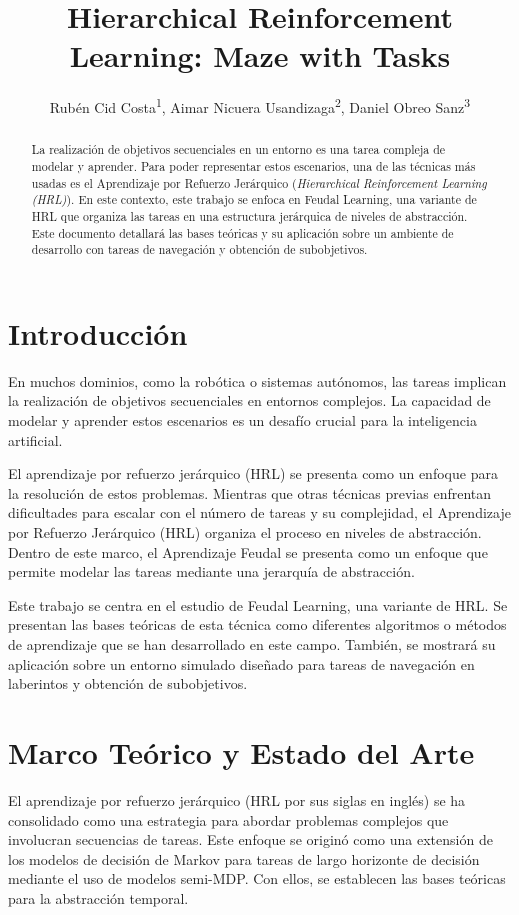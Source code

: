 \documentclass[letterpaper]{article} %
\title{Hierarchical Reinforcement Learning: Maze with Tasks}
\author {
    Rubén Cid Costa\textsuperscript{\rm 1},
    Aimar Nicuera Usandizaga\textsuperscript{\rm 2},
    Daniel Obreo Sanz\textsuperscript{\rm 3}
}
\begin{document}
\maketitle

\begin{abstract}
La realización de objetivos secuenciales en un entorno es una tarea compleja de modelar y aprender. Para poder representar estos
escenarios, una de las técnicas más usadas es el Aprendizaje por Refuerzo Jerárquico (\textit{Hierarchical Reinforcement Learning (HRL)}).
En este contexto, este trabajo se enfoca en Feudal Learning, una variante de HRL que organiza las tareas en una estructura jerárquica de
niveles de abstracción. Este documento detallará las bases teóricas y su aplicación sobre un ambiente de desarrollo con tareas de navegación y
obtención de subobjetivos.
\end{abstract}

\section{Introducción}

En muchos dominios, como la robótica o sistemas autónomos, las tareas implican la realización de objetivos secuenciales en entornos complejos.
La capacidad de modelar y aprender estos escenarios es un desafío crucial para la inteligencia artificial.


El aprendizaje por refuerzo jerárquico (HRL) se presenta como un enfoque para la resolución de estos problemas. Mientras que otras técnicas previas
enfrentan dificultades para escalar con el número de tareas y su complejidad, el Aprendizaje por Refuerzo Jerárquico (HRL) organiza el proceso en 
niveles de abstracción. Dentro de este marco, el Aprendizaje Feudal se presenta como un enfoque que permite modelar las tareas mediante una jerarquía
de abstracción.


Este trabajo se centra en el estudio de Feudal Learning, una variante de HRL. Se presentan las bases teóricas de esta técnica como diferentes algoritmos
o métodos de aprendizaje que se han desarrollado en este campo. También, se mostrará su aplicación sobre un entorno simulado diseñado para tareas 
de navegación en laberintos y obtención de subobjetivos. 

\section{Marco Teórico y Estado del Arte}
El aprendizaje por refuerzo jerárquico (HRL por sus siglas en inglés) se ha consolidado como una estrategia para abordar problemas complejos
que involucran secuencias de tareas. Este enfoque se originó como una extensión de los modelos de decisión de Markov para tareas de largo horizonte
de decisión mediante el uso de modelos semi-MDP\cite{sutton1999between}. Con ellos, se establecen las bases teóricas para la abstracción temporal.
\end{document}

